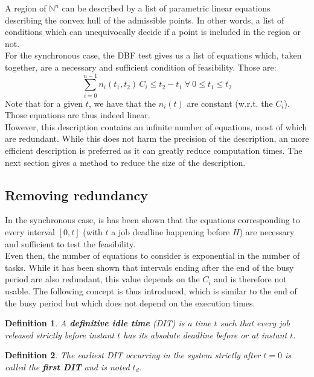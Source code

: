 \documentclass[times, 10pt,twocolumn, a4paper]{article}
\newtheorem{definition}{Definition}
\begin{document}
  \label{sct:cspaceDescr}

A region of $\mathbb{N}^n$ can be described by a list of parametric linear equations describing the convex hull of the admissible points. In other words, a list of conditions which can unequivocally decide if a point is included in the region or not.\\

For the synchronous case, the DBF test gives us a list of equations which, taken together, are a necessary and sufficient condition of feasibility. Those are:
$$\sum_{i=0}^{n-1} n_i(t_1, t_2) \, C_i \leq t_2 - t_1 \; \forall \: 0 \leq t_1 \leq t_2$$
Note that for a given $t$, we have that the $n_i(t)$ are constant (w.r.t. the $C_i$). Those equations are thus indeed linear.\\

However, this description contains an infinite number of equations, most of which are redundant. While this does not harm the precision of the description, an more efficient description is preferred as it can greatly reduce computation times. The next section gives a method to reduce the size of the description.

\subsection{Removing redundancy}

In the synchronous case, is has been shown that the equations corresponding to every interval $[0, t]$ (with $t$ a job deadline happening before $H$) are necessary and sufficient to test the feasibility.\\

Even then, the number of equations to consider is exponential in the number of tasks. While it has been shown that intervals ending after the end of the busy period are also redundant, this value depends on the $C_i$ and is therefore not usable. The following concept is thus introduced, which is similar to the end of the busy period but which does not depend on the execution times.

\begin{definition}
A \textbf{definitive idle time} (DIT) is a time $t$ such that every job released strictly before instant $t$ has its absolute deadline before or at instant $t$.
\end{definition}

\begin{definition}
The earliest DIT occurring in the system strictly after $t=0$ is called the \textbf{first DIT} and is noted $t_d$.
\end{definition}
\end{document}
